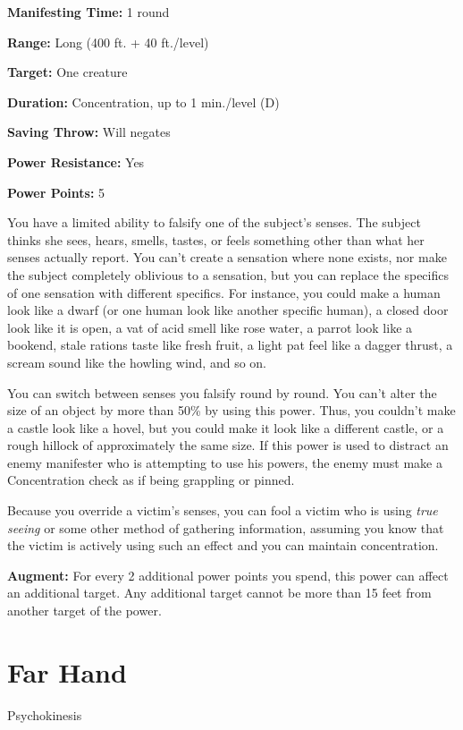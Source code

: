 \documentclass{article}
\begin{document}
\textbf{Manifesting Time:} 1 round

\textbf{Range:} Long (400 ft. + 40 ft./level)

\textbf{Target:} One creature

\textbf{Duration:} Concentration, up to 1 min./level (D)

\textbf{Saving Throw:} Will negates

\textbf{Power Resistance:} Yes

\textbf{Power Points:} 5

You have a limited ability to falsify one of the subject's senses. The subject 
thinks she sees, hears, smells, tastes, or feels something other than what her 
senses actually report. You can't create a sensation where none exists, nor make 
the subject completely oblivious to a sensation, but you can replace the specifics 
of one sensation with different specifics. For instance, you could make a human 
look like a dwarf (or one human look like another specific human), a closed door 
look like it is open, a vat of acid smell like rose water, a parrot look like a 
bookend, stale rations taste like fresh fruit, a light pat feel like a dagger thrust, 
a scream sound like the howling wind, and so on.

You can switch between senses you falsify round by round. You can't alter the size 
of an object by more than 50\% by using this power. Thus, you couldn't make a castle 
look like a hovel, but you could make it look like a different castle, or a rough 
hillock of approximately the same size. If this power is used to distract an enemy 
manifester who is attempting to use his powers, the enemy must make a Concentration 
check as if being grappling or pinned.

Because you override a victim's senses, you can fool a victim who is using \textit{true 
seeing }or some other method of gathering information, assuming you know that the 
victim is actively using such an effect and you can maintain concentration.

\textbf{Augment:} For every 2 additional power points you spend, this power can 
affect an additional target. Any additional target cannot be more than 15 feet 
from another target of the power.

\vspace{12pt}
\section*{Far Hand}

Psychokinesis
\end{document}
